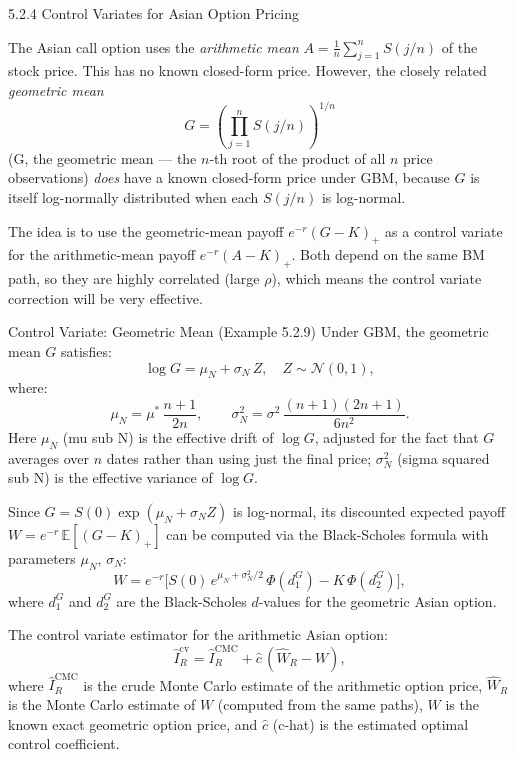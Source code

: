 \documentclass[aspectratio=169,10pt]{beamer}
\begin{document}
\begin{frame}[allowframebreaks]{5.2.4 Control Variates for Asian Option Pricing}

The Asian call option uses the \emph{arithmetic mean}
$A = \frac{1}{n}\sum_{j=1}^n S(j/n)$ of the stock price.  This has no
known closed-form price.  However, the closely related \emph{geometric mean}
\[
  G = \left(\prod_{j=1}^n S(j/n)\right)^{1/n}
\]
(G, the geometric mean --- the $n$-th root of the product of all $n$ price
observations) \emph{does} have a known closed-form price under GBM, because $G$
is itself log-normally distributed when each $S(j/n)$ is log-normal.

The idea is to use the geometric-mean payoff $e^{-r}(G-K)_+$ as a control
variate for the arithmetic-mean payoff $e^{-r}(A-K)_+$.  Both depend on the same
BM path, so they are highly correlated (large $\rho$), which means the control
variate correction will be very effective.

\begin{block}{Control Variate: Geometric Mean (Example 5.2.9)}
  Under GBM, the geometric mean $G$ satisfies:
  \[
    \log G = \mu_N + \sigma_N\,Z,
    \quad Z \sim \mathcal{N}(0,1),
  \]
  where:
  \[
    \mu_N = \mu^*\,\frac{n+1}{2n}, \qquad
    \sigma_N^2 = \sigma^2\,\frac{(n+1)(2n+1)}{6n^2}.
  \]
  Here $\mu_N$ (mu sub N) is the effective drift of $\log G$, adjusted for the
  fact that $G$ averages over $n$ dates rather than using just the final price;
  $\sigma_N^2$ (sigma squared sub N) is the effective variance of $\log G$.

  Since $G = S(0)\exp(\mu_N + \sigma_N Z)$ is log-normal, its discounted expected
  payoff $W = e^{-r}\,\mathbb{E}[(G - K)_+]$ can be computed via the Black-Scholes
  formula with parameters $\mu_N$, $\sigma_N$:
  \[
    W = e^{-r}\bigl[S(0)\,e^{\mu_N + \sigma_N^2/2}\,\Phi(d_1^G) - K\,\Phi(d_2^G)\bigr],
  \]
  where $d_1^G$ and $d_2^G$ are the Black-Scholes $d$-values for the geometric
  Asian option.

  The control variate estimator for the arithmetic Asian option:
  \[
    \hat{I}_R^{\mathrm{cv}} = \hat{I}_R^{\mathrm{CMC}} + \hat{c}\,(\hat{W}_R - W),
  \]
  where $\hat{I}_R^{\mathrm{CMC}}$ is the crude Monte Carlo estimate of the
  arithmetic option price, $\hat{W}_R$ is the Monte Carlo estimate of $W$
  (computed from the same paths), $W$ is the known exact geometric option price,
  and $\hat{c}$ (c-hat) is the estimated optimal control coefficient.
\end{block}


\end{frame}
\end{document}
